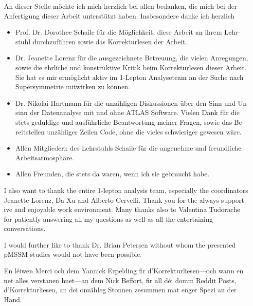 
\begin{acknowledgements}[Acknowledgements]  

\begin{otherlanguage}{ngerman} 
An dieser Stelle möchte ich mich herzlich bei allen bedanken, die mich bei der Anfertigung dieser Arbeit unterstützt haben. Insbesondere danke ich herzlich
\begin{itemize}
	\item Prof.\@\xspace Dr.\@\xspace Dorothee Schaile für die Möglichkeit, diese Arbeit an ihrem Lehrstuhl durchzuführen sowie das Korrekturlesen der Arbeit. 
	\item Dr.\@\xspace Jeanette Lorenz für die ausgezeichnete Betreuung, die vielen Anregungen, sowie die ehrliche und konstruktive Kritik beim Korrekturlesen dieser Arbeit. Sie hat es mir ermöglicht aktiv im 1-Lepton Analyseteam an der Suche nach Supersymmetrie mitwirken zu können.  
	\item Dr.\@\xspace Nikolai Hartmann für die unzähligen Diskussionen über den Sinn und Unsinn der Datenanalyse mit und ohne ATLAS Software. Vielen Dank für die stets geduldige und ausführliche Beantwortung meiner Fragen, sowie das Bereitstellen unzähliger Zeilen Code, ohne die vieles schwieriger gewesen wäre. 
	\item Allen Mitgliedern des Lehrstuhls Schaile für die angenehme und freundliche Arbeitsatmosphäre.
	\item Allen Freunden, die stets da waren, wenn ich sie gebraucht habe.
\end{itemize}
\end{otherlanguage}  
\begin{otherlanguage}{british} 
I also want to thank the entire 1-lepton analysis team, especially the coordinators Jeanette Lorenz, Da Xu and Alberto Cervelli. Thank you for the always supportive and enjoyable work environment. Many thanks also to Valentina Tudorache for patiently answering all my questions as well as all the entertaining conversations.

I would further like to thank Dr.\@\xspace Brian Petersen without whom the presented pMSSM studies would not have been possible.

\end{otherlanguage}  

En léiwen Merci och dem Yannick Erpelding fir d'Korrekturliesen---och wann en net alles verstanen huet---an dem Nick Beffort, fir all déi domm Reddit Posts, d'Korrekturliesen, an dei onzähleg Stonnen zesummen mat enger Spezi an der Hand. 


\end{acknowledgements}
